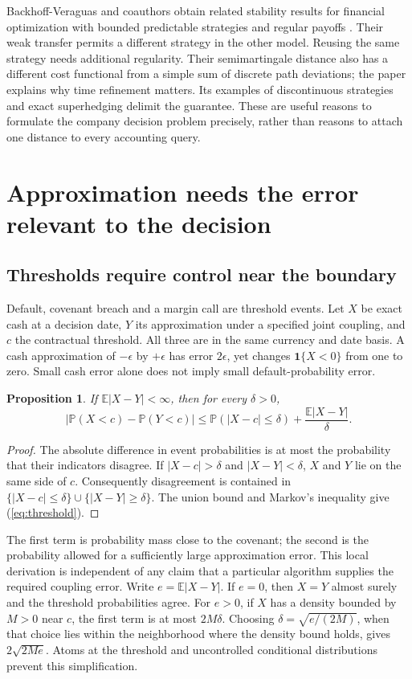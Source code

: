 \documentclass[11pt,a4paper]{article}
\newtheorem{proposition}{Proposition}
\newcommand{\E}{\mathbb E}
\newcommand{\Prob}{\mathbb P}
\newcommand{\ind}{\mathbf 1}
\begin{document}
Backhoff-Veraguas and coauthors obtain related stability results for financial
optimization with bounded predictable strategies and regular payoffs
\cite[Theorem~1.5; Lemma~3.7; Theorem~3.10]{adapted}. Their weak transfer
permits a different strategy in the other model. Reusing the same strategy
needs additional regularity. Their semimartingale distance also has a
different cost functional from a simple sum of discrete path deviations; the
paper explains why time refinement matters. Its examples of discontinuous
strategies and exact superhedging delimit the guarantee. These are useful
reasons to formulate the company decision problem precisely, rather than
reasons to attach one distance to every accounting query.

\section{Approximation needs the error relevant to the decision}
\subsection{Thresholds require control near the boundary}
Default, covenant breach and a margin call are threshold events. Let $X$ be
exact cash at a decision date, $Y$ its approximation under a specified joint
coupling, and $c$ the contractual threshold. All three are in the same currency
and date basis. A cash approximation of $-\epsilon$ by $+\epsilon$ has error
$2\epsilon$, yet changes $\ind\{X<0\}$ from one to zero. Small cash error
alone does not imply small default-probability error.

\begin{proposition}
If $\E|X-Y|<\infty$, then for every $\delta>0$,
\begin{equation}\label{eq:threshold}
|\Prob(X<c)-\Prob(Y<c)|
\leq \Prob(|X-c|\leq\delta)+\frac{\E|X-Y|}{\delta}.
\end{equation}
\end{proposition}
\begin{proof}
The absolute difference in event probabilities is at most the probability
that their indicators disagree. If $|X-c|>\delta$ and $|X-Y|<\delta$, $X$
and $Y$ lie on the same side of $c$. Consequently disagreement is contained
in $\{|X-c|\leq\delta\}\cup\{|X-Y|\geq\delta\}$. The union bound
and Markov's inequality give (\ref{eq:threshold}).
\end{proof}
The first term is probability mass close to the covenant; the second is the
probability allowed for a sufficiently large approximation error. This local
derivation is independent of any claim that a particular algorithm supplies
the required coupling error. Write $e=\E|X-Y|$. If $e=0$, then $X=Y$ almost surely and the threshold probabilities agree.
For $e>0$, if $X$ has a density bounded by $M>0$ near $c$,
the first term is at most $2M\delta$. Choosing
$\delta=\sqrt{e/(2M)}$, when that choice lies within the neighborhood where
the density bound holds, gives $2\sqrt{2Me}$. Atoms at the threshold and
uncontrolled conditional distributions prevent this simplification.
\end{document}
